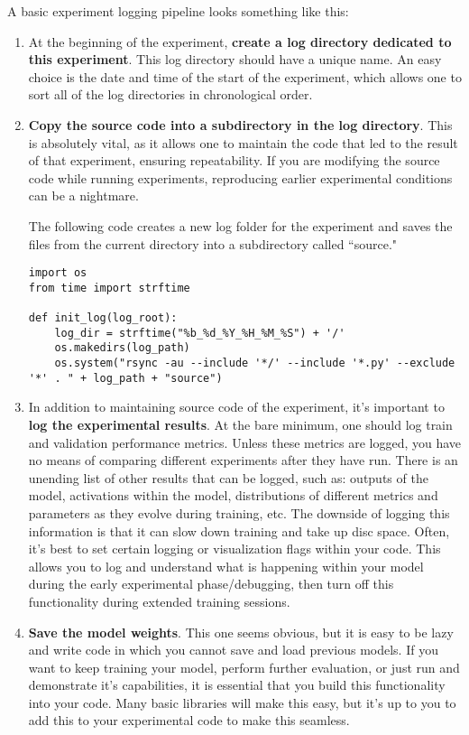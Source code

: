 A basic experiment logging pipeline looks something like this:

\begin{enumerate}
	\item At the beginning of the experiment, \textbf{create a log directory dedicated to this experiment}. This log directory should have a unique name. An easy choice is the date and time of the start of the experiment, which allows one to sort all of the log directories in chronological order.

	\item \textbf{Copy the source code into a subdirectory in the log directory}. This is absolutely vital, as it allows one to maintain the code that led to the result of that experiment, ensuring repeatability. If you are modifying the source code while running experiments, reproducing earlier experimental conditions can be a nightmare. 
	
	The following code creates a new log folder for the experiment and saves the files from the current directory into a subdirectory called ``source."

\begin{lstlisting}[style=python]
import os
from time import strftime

def init_log(log_root):
	log_dir = strftime("%b_%d_%Y_%H_%M_%S") + '/'
	os.makedirs(log_path)
    os.system("rsync -au --include '*/' --include '*.py' --exclude '*' . " + log_path + "source")
\end{lstlisting}

	\item In addition to maintaining source code of the experiment, it's important to \textbf{log the experimental results}. At the bare minimum, one should log train and validation performance metrics. Unless these metrics are logged, you have no means of comparing different experiments after they have run. There is an unending list of other results that can be logged, such as: outputs of the model, activations within the model, distributions of different metrics and parameters as they evolve during training, etc. The downside of logging this information is that it can slow down training and take up disc space. Often, it's best to set certain logging or visualization flags within your code. This allows you to log and understand what is happening within your model during the early experimental phase/debugging, then turn off this functionality during extended training sessions.
	
	\item \textbf{Save the model weights}. This one seems obvious, but it is easy to be lazy and write code in which you cannot save and load previous models. If you want to keep training your model, perform further evaluation, or just run and demonstrate it's capabilities, it is essential that you build this functionality into your code. Many basic libraries will make this easy, but it's up to you to add this to your experimental code to make this seamless.

\end{enumerate}

